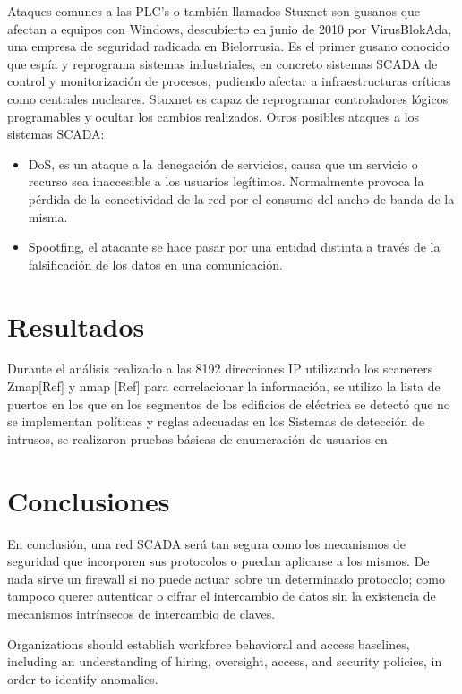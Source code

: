 \documentclass[jou]{apa6}   %
\begin{document}
Ataques comunes a las PLC’s o también llamados Stuxnet son gusanos que afectan a equipos con Windows, descubierto en junio de 2010 por VirusBlokAda, una empresa de seguridad radicada en Bielorrusia. Es el primer gusano conocido que espía y reprograma sistemas industriales, en concreto sistemas SCADA de control y monitorización de procesos, pudiendo afectar a infraestructuras críticas como centrales nucleares. 
Stuxnet es capaz de reprogramar controladores lógicos programables y ocultar los cambios realizados. 
Otros posibles ataques a los sistemas SCADA:

\begin{itemize}
\item DoS, es un ataque a la denegación de servicios, causa que un servicio o recurso sea inaccesible a los usuarios legítimos. Normalmente provoca la pérdida de la conectividad de la red por el consumo del ancho de banda de la misma.
\item Spootfing, el atacante se hace pasar por una entidad distinta a través de la falsificación de los datos en una comunicación.
\end{itemize}


\section{Resultados }

Durante el análisis realizado a las 8192 direcciones IP utilizando los scanerers Zmap[Ref] y nmap [Ref] para correlacionar la información, se utilizo la lista de puertos en los que  en los segmentos de los edificios de eléctrica se detectó que no se implementan políticas y reglas adecuadas en los  Sistemas de detección de intrusos, se realizaron pruebas básicas de enumeración de usuarios en 

\section{Conclusiones }

En conclusión, una red SCADA será tan segura como los  mecanismos de seguridad que incorporen sus protocolos o puedan aplicarse a los mismos. De nada sirve un firewall si no puede actuar sobre un determinado protocolo; como tampoco querer autenticar o cifrar el intercambio de datos sin la existencia de mecanismos intrínsecos de intercambio de claves.

Organizations should establish workforce behavioral and access baselines, including
an understanding of hiring, oversight, access, and security policies, in order to identify
anomalies.
\end{document}
